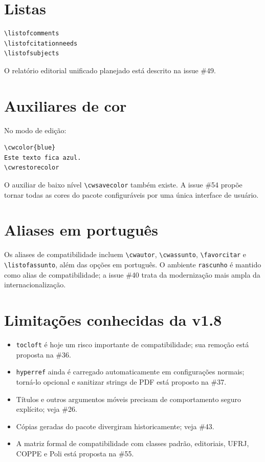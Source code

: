 \documentclass[11pt]{article}
\newcommand{\cmd}[1]{\texttt{\textbackslash#1}}
\begin{document}
\section*{Listas}

\begin{verbatim}
\listofcomments
\listofcitationneeds
\listofsubjects
\end{verbatim}

O relatório editorial unificado planejado está descrito na issue \#49.

\section*{Auxiliares de cor}

No modo de edição:

\begin{verbatim}
\cwcolor{blue}
Este texto fica azul.
\cwrestorecolor
\end{verbatim}

O auxiliar de baixo nível \cmd{cwsavecolor} também existe. A issue \#54 propõe tornar todas as cores do pacote configuráveis por uma única interface de usuário.

\section*{Aliases em português}

Os aliases de compatibilidade incluem \cmd{cwautor}, \cmd{cwassunto}, \cmd{favorcitar} e \cmd{listofassunto}, além das opções em português. O ambiente \texttt{rascunho} é mantido como alias de compatibilidade; a issue \#40 trata da modernização mais ampla da internacionalização.

\section*{Limitações conhecidas da v1.8}

\begin{itemize}
\item \texttt{tocloft} é hoje um risco importante de compatibilidade; sua remoção está proposta na \#36.
\item \texttt{hyperref} ainda é carregado automaticamente em configurações normais; torná-lo opcional e sanitizar strings de PDF está proposto na \#37.
\item Títulos e outros argumentos móveis precisam de comportamento seguro explícito; veja \#26.
\item Cópias geradas do pacote divergiram historicamente; veja \#43.
\item A matriz formal de compatibilidade com classes padrão, editoriais, UFRJ, COPPE e Poli está proposta na \#55.
\end{itemize}
\end{document}
